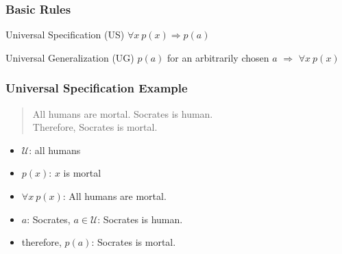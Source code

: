 \documentclass[dvipsnames]{beamer}
\begin{document}
\begin{frame}
  \frametitle{Basic Rules}

  \begin{block}{Universal Specification (US)}
    $\forall x~p(x) \Rightarrow p(a)$
  \end{block}

  \pause
  \begin{block}{Universal Generalization (UG)}
    $p(a)$ for an \alert{arbitrarily chosen} $a$
      $\Rightarrow$ $\forall x~p(x)$
  \end{block}
\end{frame}

\begin{frame}
  \frametitle{Universal Specification Example}

  \begin{example}
    \begin{quote}
      All humans are mortal. Socrates is human.\\
      Therefore, Socrates is mortal.
    \end{quote}

    \pause
    \begin{itemize}
      \item $\mathcal{U}$: all humans
      \item $p(x)$: $x$ is mortal
      \item $\forall x~p(x)$: All humans are mortal.
      \item $a$: Socrates, $a \in \mathcal{U}$: Socrates is human.
      \item therefore, $p(a)$: Socrates is mortal.
    \end{itemize}
  \end{example}
\end{frame}
\end{document}
